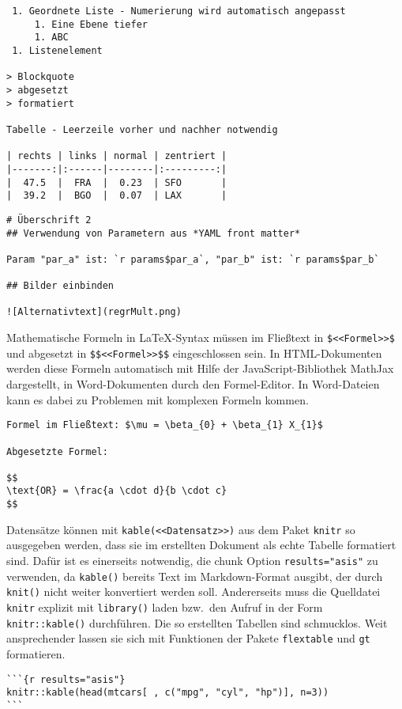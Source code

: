 \begin{lstlisting}
 1. Geordnete Liste - Numerierung wird automatisch angepasst
     1. Eine Ebene tiefer
     1. ABC
 1. Listenelement

> Blockquote
> abgesetzt
> formatiert

Tabelle - Leerzeile vorher und nachher notwendig

| rechts | links | normal | zentriert |
|-------:|:------|--------|:---------:|
|  47.5  |  FRA  |  0.23  | SFO       |
|  39.2  |  BGO  |  0.07  | LAX       |
\end{lstlisting}

\begin{lstlisting}
# Überschrift 2
## Verwendung von Parametern aus *YAML front matter*

Param "par_a" ist: `r params$par_a`, "par_b" ist: `r params$par_b`

## Bilder einbinden

![Alternativtext](regrMult.png)
\end{lstlisting}

Mathematische Formeln in \LaTeX-Syntax müssen im Fließtext in \lstinline!$<<Formel>>$! und abgesetzt in \lstinline!$$<<Formel>>$$! eingeschlossen sein. In HTML-Dokumenten werden diese Formeln automatisch mit Hilfe der JavaScript-Bibliothek MathJax dargestellt, in Word-Dokumenten durch den Formel-Editor. In Word-Dateien kann es dabei zu Problemen mit komplexen Formeln kommen.
\begin{lstlisting}
Formel im Fließtext: $\mu = \beta_{0} + \beta_{1} X_{1}$

Abgesetzte Formel:

$$
\text{OR} = \frac{a \cdot d}{b \cdot c}
$$
\end{lstlisting}

Datensätze können mit \lstinline!kable(<<Datensatz>>)! aus dem Paket \lstinline!knitr! so ausgegeben werden, dass sie im erstellten Dokument als echte Tabelle formatiert sind. Dafür ist es einerseits notwendig, die chunk Option \lstinline!results="asis"! zu verwenden, da \lstinline!kable()! bereits Text im Markdown-Format ausgibt, der durch \lstinline!knit()! nicht weiter konvertiert werden soll. Andererseits muss die Quelldatei \lstinline!knitr! explizit mit \lstinline!library()! laden bzw.\ den Aufruf in der Form \lstinline!knitr::kable()! durchführen. Die so erstellten Tabellen sind schmucklos. Weit ansprechender lassen sie sich mit Funktionen der Pakete  \lstinline!flextable! \cite{Gohel2019} und  \lstinline!gt! \cite{Iannone2024} formatieren.
\begin{lstlisting}
```{r results="asis"}
knitr::kable(head(mtcars[ , c("mpg", "cyl", "hp")], n=3))
```
\end{lstlisting}

